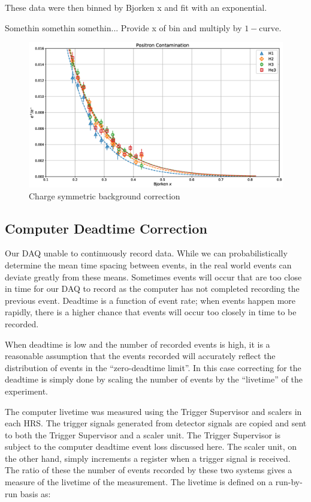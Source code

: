 These data were then binned by Bjorken x and fit with an exponential. 

Somethin somethin somethin... Provide x of bin and multiply by $1-\mathrm{curve}$.

\begin{figure}
	\includegraphics[width=\textwidth]{./analysis/fig/positrons.eps}
	\caption{Charge symmetric background correction}
	\label{fig:positrons}
\end{figure}

\subsection{Computer Deadtime Correction}

Our DAQ unable to continuously record data. While we can probabilistically determine the mean time spacing between events, in the real world events can deviate greatly from these means. Sometimes events will occur that are too close in time for our DAQ to record as the computer has not completed recording the previous event. Deadtime is a function of event rate; when events happen more rapidly, there is a higher chance that events will occur too closely in time to be recorded.

When deadtime is low and the number of recorded events is high, it is a reasonable assumption that the events recorded will accurately reflect the distribution of events in the ``zero-deadtime limit''. In this case correcting for the deadtime is simply done by scaling the number of events by the ``livetime'' of the experiment.

The computer livetime was measured using the Trigger Supervisor and scalers in each HRS. The trigger signals generated from detector signals are copied and sent to both the Trigger Supervisor and a scaler unit. The Trigger Supervisor is subject to the computer deadtime event loss discussed here. The scaler unit, on the other hand, simply increments a register when a trigger signal is received. The ratio of these the number of events recorded by these two systems gives a measure of the livetime of the measurement. The livetime is defined on a run-by-run basis as:

